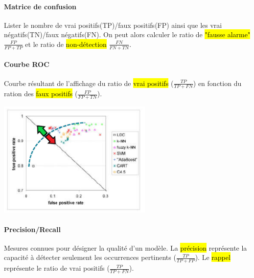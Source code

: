 \documentclass[letterpaper, 12pt]{article}
\begin{document}
				\paragraph{Matrice de confusion} Lister le nombre de vrai positifs(TP)/faux positifs(FP) ainsi que les vrai 
					négatifs(TN)/faux négatifs(FN). On peut alors calculer le ratio de \hl{"fausse alarme"} $\frac{FP}{FP + TP}$
					et le ratio de \hl{non-détection} $\frac{FN}{FN + TN}$.\\
				\begin{minipage}{0.5\textwidth}
					\paragraph{Courbe ROC} Courbe résultant de l'affichage du ratio de \hl{vrai positifs} ($\frac{TP}{TP + FN}$) 
						en fonction	du ration des \hl{faux positifs} ($\frac{FP}{FP + TN}$).
				\end{minipage} \hfill
				\begin{minipage}{0.48\textwidth}
					\begin{center}
						\includegraphics[width=3in]{Images/ROC} 
					\end{center}
				\end{minipage}
				\paragraph{Precision/Recall} Mesures connues pour désigner la qualité d'un modèle. La \hl{précision} représente la 
					capacité à détecter seulement les occurrences pertinents ($\frac{TP}{TP + FP}$). Le \hl{rappel} représente
					le ratio de vrai positifs ($\frac{TP}{TP + FN}$).
\end{document}
